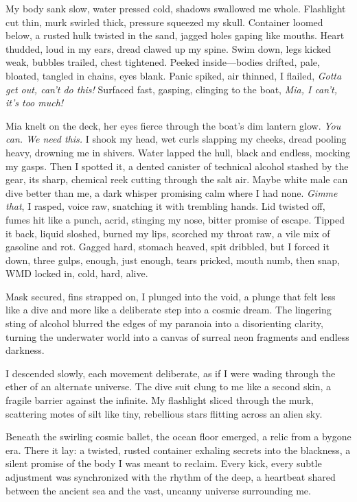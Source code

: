 \documentclass[12pt,oneside]{book} %
\begin{document}
My body sank slow, water pressed cold, shadows swallowed me whole. Flashlight cut thin, murk swirled thick, pressure squeezed my skull. Container loomed below, a rusted hulk twisted in the sand, jagged holes gaping like mouths. Heart thudded, loud in my ears, dread clawed up my spine. Swim down, legs kicked weak, bubbles trailed, chest tightened. Peeked inside—bodies drifted, pale, bloated, tangled in chains, eyes blank. Panic spiked, air thinned, I flailed, \textit{Gotta get out, can’t do this!} Surfaced fast, gasping, clinging to the boat, \textit{Mia, I can’t, it’s too much!}

Mia knelt on the deck, her eyes fierce through the boat’s dim lantern glow. \textit{You can. We need this.} I shook my head, wet curls slapping my cheeks, dread pooling heavy, drowning me in shivers. Water lapped the hull, black and endless, mocking my gasps. Then I spotted it, a dented canister of technical alcohol stashed by the gear, its sharp, chemical reek cutting through the salt air. Maybe white male can dive better than me, a dark whisper promising calm where I had none. \textit{Gimme that}, I rasped, voice raw, snatching it with trembling hands. Lid twisted off, fumes hit like a punch, acrid, stinging my nose, bitter promise of escape. Tipped it back, liquid sloshed, burned my lips, scorched my throat raw, a vile mix of gasoline and rot. Gagged hard, stomach heaved, spit dribbled, but I forced it down, three gulps, enough, just enough, tears pricked, mouth numb, then snap, WMD locked in, cold, hard, alive.

Mask secured, fins strapped on, I plunged into the void, a plunge that felt less like a dive and more like a deliberate step into a cosmic dream. The lingering sting of alcohol blurred the edges of my paranoia into a disorienting clarity, turning the underwater world into a canvas of surreal neon fragments and endless darkness.

I descended slowly, each movement deliberate, as if I were wading through the ether of an alternate universe. The dive suit clung to me like a second skin, a fragile barrier against the infinite. My flashlight sliced through the murk, scattering motes of silt like tiny, rebellious stars flitting across an alien sky.

Beneath the swirling cosmic ballet, the ocean floor emerged, a relic from a bygone era. There it lay: a twisted, rusted container exhaling secrets into the blackness, a silent promise of the body I was meant to reclaim. Every kick, every subtle adjustment was synchronized with the rhythm of the deep, a heartbeat shared between the ancient sea and the vast, uncanny universe surrounding me.
\end{document}
